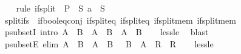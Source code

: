 \begin{isabellebody}
%
\isadelimproof
\ \ %
\endisadelimproof
%
\isatagproof
{}\isamarkupfalse%
\ {\isacharparenleft}{\kern0pt}rule\ if{\isacharunderscore}{\kern0pt}split\ {\isacharbrackleft}{\kern0pt}\ P\ {\isacharequal}{\kern0pt}\ {\isachardoublequoteopen}{\isasymlambda}S{\isachardot}{\kern0pt}\ a\ {\isasymin}\ S{\isachardoublequoteclose}{\isacharbrackright}{\kern0pt}{\isacharparenright}{\kern0pt}%
\endisatagproof
{\isafoldproof}%
%
\isadelimproof
\isanewline
%
\endisadelimproof
\isanewline
{}\isamarkupfalse%
\ split{\isacharunderscore}{\kern0pt}ifs\ {\isacharequal}{\kern0pt}\ if{\isacharunderscore}{\kern0pt}bool{\isacharunderscore}{\kern0pt}eq{\isacharunderscore}{\kern0pt}conj\ if{\isacharunderscore}{\kern0pt}split{\isacharunderscore}{\kern0pt}eq{}\ if{\isacharunderscore}{\kern0pt}split{\isacharunderscore}{\kern0pt}eq{}\ if{\isacharunderscore}{\kern0pt}split{\isacharunderscore}{\kern0pt}mem{}\ if{\isacharunderscore}{\kern0pt}split{\isacharunderscore}{\kern0pt}mem{}%
\isadelimdocument
%
\endisadelimdocument
%
\isatagdocument
%
\isamarkuptrue%
%
\isamarkuptrue%
%
\endisatagdocument
{\isafolddocument}%
%
\isadelimdocument
%
\endisadelimdocument
{}\isamarkupfalse%
\ psubsetI\ {\isacharbrackleft}{\kern0pt}intro{\isacharbang}{\kern0pt}{\isacharbrackright}{\kern0pt}{\isacharcolon}{\kern0pt}\ {\isachardoublequoteopen}A\ {\isasymsubseteq}\ B\ {\isasymLongrightarrow}\ A\ {\isasymnoteq}\ B\ {\isasymLongrightarrow}\ A\ {\isasymsubset}\ B{\isachardoublequoteclose}\isanewline
%
\isadelimproof
\ \ %
\endisadelimproof
%
\isatagproof
{}\isamarkupfalse%
\ less{\isacharunderscore}{\kern0pt}le\ \isamarkupfalse%
\ blast%
\endisatagproof
{\isafoldproof}%
%
\isadelimproof
\isanewline
%
\endisadelimproof
\isanewline
{}\isamarkupfalse%
\ psubsetE\ {\isacharbrackleft}{\kern0pt}elim{\isacharbang}{\kern0pt}{\isacharbrackright}{\kern0pt}{\isacharcolon}{\kern0pt}\ {\isachardoublequoteopen}A\ {\isasymsubset}\ B\ {\isasymLongrightarrow}\ {\isacharparenleft}{\kern0pt}A\ {\isasymsubseteq}\ B\ {\isasymLongrightarrow}\ {\isasymnot}\ B\ {\isasymsubseteq}\ A\ {\isasymLongrightarrow}\ R{\isacharparenright}{\kern0pt}\ {\isasymLongrightarrow}\ R{\isachardoublequoteclose}\isanewline
%
\isadelimproof
\ \ %
\endisadelimproof
%
\isatagproof
{}\isamarkupfalse%
\ less{\isacharunderscore}{\kern0pt}le\ \isamarkupfalse%

\end{isabellebody}
